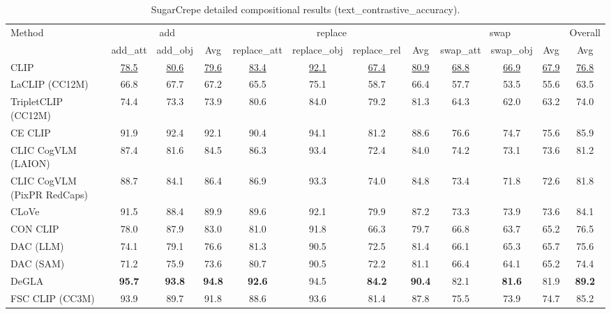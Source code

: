 \begin{table}[t]
  \centering
  \scriptsize
  \caption{SugarCrepe detailed compositional results (text_contrastive_accuracy).}
  \label{tab:SugarCrepe_detailed}
  \begin{adjustbox}{max width=\textwidth}
  \setlength{\tabcolsep}{2pt}
  \begin{tabular}{p{5cm}ccc|cccc|ccc|c}
    \toprule
    Method & \multicolumn{3}{c}{add} & \multicolumn{4}{c}{replace} & \multicolumn{3}{c}{swap} & Overall \\
     & add\_att & add\_obj & Avg & replace\_att & replace\_obj & replace\_rel & Avg & swap\_att & swap\_obj & Avg & Avg \\
    \midrule
    CLIP & \underline{78.5} & \underline{80.6} & \underline{79.6} & \underline{83.4} & \underline{92.1} & \underline{67.4} & \underline{80.9} & \underline{68.8} & \underline{66.9} & \underline{67.9} & \underline{76.8} \\
    \midrule
    LaCLIP (CC12M) & 66.8 & 67.7 & 67.2 & 65.5 & 75.1 & 58.7 & 66.4 & 57.7 & 53.5 & 55.6 & 63.5 \\
    TripletCLIP (CC12M) & 74.4 & 73.3 & 73.9 & 80.6 & 84.0 & 79.2 & 81.3 & 64.3 & 62.0 & 63.2 & 74.0 \\
    \midrule
    CE CLIP & 91.9 & 92.4 & 92.1 & 90.4 & 94.1 & 81.2 & 88.6 & 76.6 & 74.7 & 75.6 & 85.9 \\
    CLIC CogVLM (LAION) & 87.4 & 81.6 & 84.5 & 86.3 & 93.4 & 72.4 & 84.0 & 74.2 & 73.1 & 73.6 & 81.2 \\
    CLIC CogVLM (PixPR RedCaps) & 88.7 & 84.1 & 86.4 & 86.9 & 93.3 & 74.0 & 84.8 & 73.4 & 71.8 & 72.6 & 81.8 \\
    CLoVe & 91.5 & 88.4 & 89.9 & 89.6 & 92.1 & 79.9 & 87.2 & 73.3 & 73.9 & 73.6 & 84.1 \\
    CON CLIP & 78.0 & 87.9 & 83.0 & 81.0 & 91.8 & 66.3 & 79.7 & 66.8 & 63.7 & 65.2 & 76.5 \\
    DAC (LLM) & 74.1 & 79.1 & 76.6 & 81.3 & 90.5 & 72.5 & 81.4 & 66.1 & 65.3 & 65.7 & 75.6 \\
    DAC (SAM) & 71.2 & 75.9 & 73.6 & 80.7 & 90.5 & 72.2 & 81.1 & 66.4 & 64.1 & 65.2 & 74.4 \\
    DeGLA & \textbf{95.7} & \textbf{93.8} & \textbf{94.8} & \textbf{92.6} & 94.5 & \textbf{84.2} & \textbf{90.4} & 82.1 & \textbf{81.6} & 81.9 & \textbf{89.2} \\
    FSC CLIP (CC3M) & 93.9 & 89.7 & 91.8 & 88.6 & 93.6 & 81.4 & 87.8 & 75.5 & 73.9 & 74.7 & 85.2 \\

\end{tabular}
\end{adjustbox}
\end{table}
